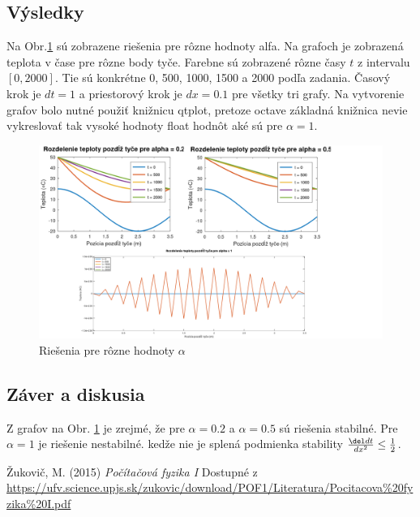 \documentclass{article}
\theoremstyle{definition}
\theoremstyle{remark}
\begin{document}
\subsection{Výsledky}
Na Obr.\ref{fig:ftcs} sú zobrazene riešenia pre rôzne hodnoty alfa. Na grafoch je zobrazená teplota v čase pre rôzne body tyče. Farebne sú zobrazené rôzne časy $t$ z intervalu $[0,2000]$. Tie sú konkrétne 0, 500, 1000, 1500 a 2000 podľa zadania. Časový krok je $dt = 1$ a priestorový krok je $dx = 0.1$ pre všetky tri grafy. Na vytvorenie grafov bolo nutné použiť knižnicu qtplot, pretoze octave základná knižnica nevie vykreslovať tak vysoké hodnoty float hodnôt aké sú pre $\alpha = 1$.
\begin{figure}[H]
    \centering
    \includegraphics[width=1\textwidth]{hw3pic.png}
    \caption{Riešenia pre rôzne hodnoty $\alpha$}
    \label{fig:ftcs}
\end{figure}





\subsection{Záver a diskusia}
Z grafov na Obr. \ref{fig:ftcs} je zrejmé, že pre $\alpha = 0.2$ a $\alpha = 0.5$ sú riešenia stabilné. Pre $\alpha = 1$ je riešenie nestabilné.
 kedže nie je splená podmienka stability $\frac{\del dt}{dx^2} \leq  \frac{1}{2}$. 

\pagebreak
\begin{thebibliography}{99}
Žukovič, M. (2015) \emph{Počítačová fyzika I} Dostupné z \url{https://ufv.science.upjs.sk/zukovic/download/POF1/Literatura/Pocitacova%20fyzika%20I.pdf}
\end{thebibliography}
\end{document}
